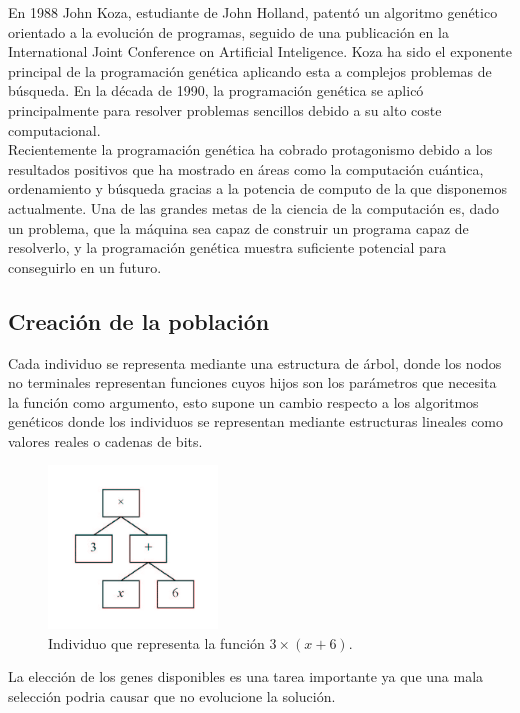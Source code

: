 \documentclass[12pt]{article} \usepackage[utf8x]{inputenc}
\begin{document}
En 1988 John Koza, estudiante de John Holland, patentó un algoritmo genético orientado a la evolución de programas, seguido de una publicación en la International Joint Conference on Artificial Inteligence. Koza ha sido el exponente principal de la programación genética aplicando esta a complejos problemas de búsqueda.
En la década de 1990, la programación genética se aplicó principalmente para resolver problemas sencillos debido a su alto coste computacional.\\

Recientemente la programación genética ha cobrado protagonismo debido a los resultados positivos que ha mostrado en áreas como la computación cuántica, ordenamiento y búsqueda gracias a la potencia de computo de la que disponemos actualmente. Una de las grandes metas de la ciencia de la computación es, dado un problema, que la máquina sea capaz de construir un programa capaz de resolverlo, y la programación genética muestra suficiente potencial para conseguirlo en un futuro.\\


\subsection {Creación de la población}

Cada individuo se representa mediante una estructura de árbol, donde los nodos no terminales representan funciones cuyos hijos son los parámetros que necesita la función como argumento, esto supone un cambio respecto a los algoritmos genéticos donde los individuos se representan mediante estructuras lineales como valores reales o cadenas de bits.

\begin{figure}[H]
    \centering
    \includegraphics[width=0.4\textwidth]{individuo.PNG}
    \caption{Individuo que representa la función \(3\times(x+6)\).}
    \label{fig:dfd:1}
\end{figure}

La elección de los genes disponibles es una tarea importante ya que una mala selección podria causar que no evolucione la solución.\\
\end{document}
